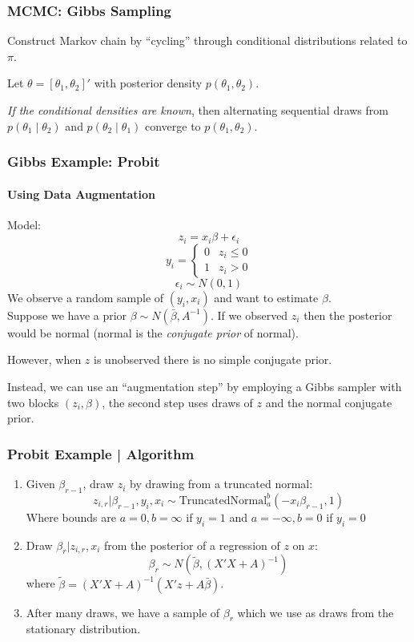 \documentclass[11pt, aspectratio=169]{beamer}
\newenvironment{wideitemize}{\itemize\addtolength{\itemsep}{10pt}}{\enditemize}
\begin{document}
\begin{frame}[c]\frametitle{MCMC: Gibbs Sampling}

Construct Markov chain by ``cycling'' through conditional distributions related to $\pi$. 

\begin{wideitemize}
	\item Let $\theta = [\theta_1, \theta_2]'$ with posterior density $p(\theta_1, \theta_2)$.
	\item \emph{If the conditional densities are known}, then alternating sequential draws from $p(\theta_1 \mid \theta_2)$ and $p(\theta_2 \mid \theta_1)$ converge to $p(\theta_1, \theta_2)$.
\end{wideitemize}


\end{frame}


\begin{frame}[c]\frametitle{Gibbs Example: Probit}
\framesubtitle{Using Data Augmentation}
    
Model: 
$$ z_i = x_i \beta + \epsilon_i $$
$$ y_i = \begin{cases} 0 & z_i \leq 0 \\ 1 & z_i > 0 \end{cases}$$
$$ \epsilon_i \sim N(0, 1)$$
We observe a random sample of $(y_i, x_i)$ and want to estimate $\beta$. \\

\vspace{1em}
Suppose we have a prior $\beta \sim N(\bar{\beta}, A^{-1})$. If we observed $z_i$ then the posterior would be normal (normal is the \emph{conjugate prior} of normal). 

\vspace{1em}
However, when $z$ is unobserved there is no simple conjugate prior.  

\vspace{1em}
Instead, we can use an ``augmentation step'' by employing a Gibbs sampler with two blocks $(z_i, \beta)$, the second step uses draws of $z$ and the normal conjugate prior.

\end{frame}


\begin{frame}[c]\frametitle{Probit Example | Algorithm}
    
\begin{enumerate}
\item Given $\beta_{r-1}$, draw $z_i$ by drawing from a truncated normal: 
$$ z_{i, r} | \beta_{r-1}, y_i, x_i \sim \mbox{TruncatedNormal}_a^b(-x_i \beta_{r-1}, 1) $$
Where bounds are $a = 0, b = \infty$ if $y_i = 1$ and $a = -\infty, b = 0$ if $y_i = 0$
\item Draw $\beta_r | z_{i,r}, x_i$ from the posterior of a regression of $z$ on $x$:
$$\beta_r \sim N(\tilde{\beta}, (X'X + A)^{-1})$$
where $\tilde{\beta} = (X'X + A)^{-1}(X'z + A\bar{\beta})$. 
\item After many draws, we have a sample of $\beta_r$ which we use as draws from the stationary distribution. 
\end{enumerate}    

\end{frame}
\end{document}
